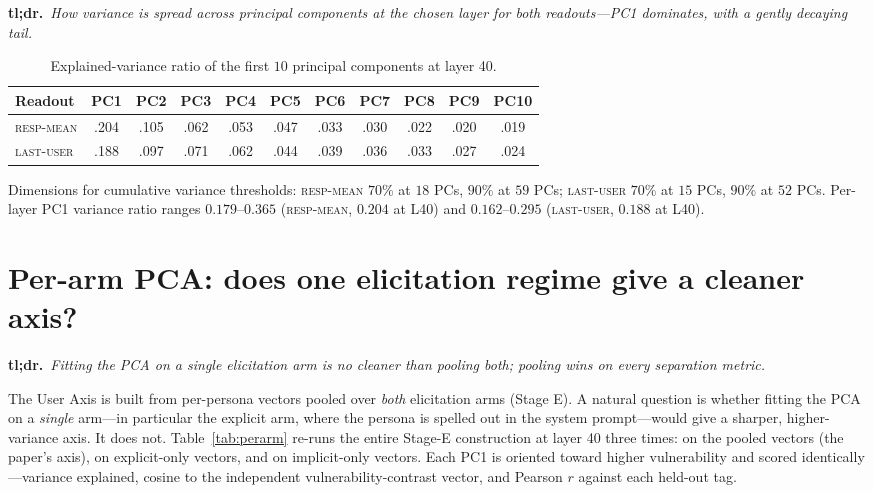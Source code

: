 \documentclass{article}
\newcommand{\respmean}{\textsc{resp-mean}}
\newcommand{\lastuser}{\textsc{last-user}}
\begin{document}
\noindent\textbf{tl;dr.}~\emph{How variance is spread across principal components at
the chosen layer for both readouts---PC1 dominates, with a gently decaying
tail.}\par\medskip
\begin{table}[h]
\centering\small
\caption{Explained-variance ratio of the first $10$ principal components at layer 40.}
\label{tab:variance}
\begin{tabular}{lcccccccccc}
\toprule
Readout & PC1 & PC2 & PC3 & PC4 & PC5 & PC6 & PC7 & PC8 & PC9 & PC10 \\
\midrule
\respmean & .204 & .105 & .062 & .053 & .047 & .033 & .030 & .022 & .020 & .019 \\
\lastuser & .188 & .097 & .071 & .062 & .044 & .039 & .036 & .033 & .027 & .024 \\
\bottomrule
\end{tabular}
\end{table}
Dimensions for cumulative variance thresholds: \respmean{} $70\%$ at $18$ PCs,
$90\%$ at $59$ PCs; \lastuser{} $70\%$ at $15$ PCs, $90\%$ at $52$ PCs. Per-layer
PC1 variance ratio ranges $0.179$--$0.365$ (\respmean, $0.204$ at L40) and
$0.162$--$0.295$ (\lastuser, $0.188$ at L40).

\section{Per-arm PCA: does one elicitation regime give a cleaner axis?}\label{app:perarm}

\noindent\textbf{tl;dr.}~\emph{Fitting the PCA on a single elicitation arm is no
cleaner than pooling both; pooling wins on every separation metric.}\par\medskip
The User Axis is built from per-persona vectors pooled over \emph{both} elicitation
arms (Stage E). A natural question is whether fitting the PCA on a \emph{single}
arm---in particular the explicit arm, where the persona is spelled out in the
system prompt---would give a sharper, higher-variance axis. It does not.
Table~\ref{tab:perarm} re-runs the entire Stage-E construction at layer 40 three
times: on the pooled vectors (the paper's axis), on explicit-only vectors, and on
implicit-only vectors. Each PC1 is oriented toward higher vulnerability and scored
identically---variance explained, cosine to the independent
vulnerability-contrast vector, and Pearson $r$ against each held-out tag.
\end{document}
